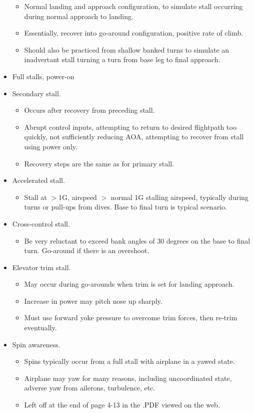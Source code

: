 \documentclass[letterpaper,10pt,titlepage]{article}
\begin{document}
\begin{itemize}
	  \begin{itemize}
	  \item Normal landing and approach configuration, to simulate stall occurring during normal approach
	        to landing.
	  \item Essentially, recover into go-around configuration, positive rate of climb.
	  \item Should also be practiced from shallow banked turns to simulate an
	        inadvertant stall turning a turn from base leg to final approach.
	  \end{itemize}
\item Full stalls, power-on
\item Secondary stall.
	  \begin{itemize}
	  \item Occurs after recovery from preceding stall.
	  \item Abrupt control inputs, attempting to return to desired flightpath too quickly,
	        not sufficiently reducing AOA, attempting to recover from stall using power only.
	  \item Recovery steps are the same as for primary stall.
	  \end{itemize}
\item Accelerated stall.
	  \begin{itemize}
	  \item Stall at $>$1G, airspeed $>$ normal 1G stalling airspeed, typically during turns or pull-ups from dives.
	        Base to final turn is typical scenario.
	  \end{itemize}
\item Cross-control stall.
	  \begin{itemize}
	  \item Be very reluctant to exceed bank angles of 30 degrees on the base to final turn.  Go-around if there is
	        an overshoot.
	  \end{itemize}
\item Elevator trim stall.
	  \begin{itemize}
	  \item May occur during go-arounds when trim is set for landing approach.
	  \item Increase in power may pitch nose up sharply.
	  \item Must use forward yoke pressure to overcome trim forces, then re-trim eventually.
	  \end{itemize}
\item Spin awareness.
	  \begin{itemize}
	  \item Spins typically occur from a full stall with airplane in a yawed state.
	  \item Airplane may yaw for many reasons, including uncoordinated state, adverse yaw from ailerons,
	        turbulence, etc.
	  \item Left off at the end of page 4-13 in the .PDF viewed on the web.
	  \end{itemize}
\end{itemize}
\end{document}
